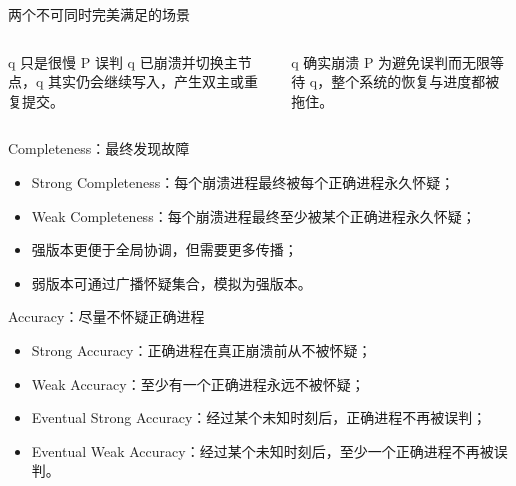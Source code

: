\documentclass[UTF8,fontset=none,aspectratio=169,10pt]{beamer}
\begin{document}
\begin{frame}{两个不可同时完美满足的场景}
\begin{columns}[T]
\begin{block}{q 只是很慢}
P 误判 q 已崩溃并切换主节点，q 其实仍会继续写入，产生双主或重复提交。
\end{block}
\begin{block}{q 确实崩溃}
P 为避免误判而无限等待 q，整个系统的恢复与进度都被拖住。
\end{block}
\end{columns}
\vfill
{}
\end{frame}


\begin{frame}{Completeness：最终发现故障}
\begin{itemize}
  \item Strong Completeness：每个崩溃进程最终被每个正确进程永久怀疑；
  \item Weak Completeness：每个崩溃进程最终至少被某个正确进程永久怀疑；
  \item 强版本更便于全局协调，但需要更多传播；
  \item 弱版本可通过广播怀疑集合，模拟为强版本。
\end{itemize}
\end{frame}

\begin{frame}{Accuracy：尽量不怀疑正确进程}
\begin{itemize}
  \item Strong Accuracy：正确进程在真正崩溃前从不被怀疑；
  \item Weak Accuracy：至少有一个正确进程永远不被怀疑；
  \item Eventual Strong Accuracy：经过某个未知时刻后，正确进程不再被误判；
  \item Eventual Weak Accuracy：经过某个未知时刻后，至少一个正确进程不再被误判。
\end{itemize}
\vfill
{}
\end{frame}
\end{document}
